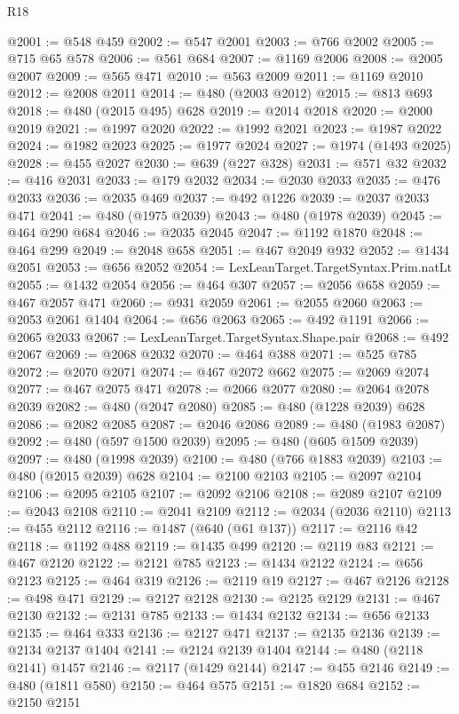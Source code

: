 \begin{lexlean}{R18}
\begin{coremodule}
@2001 := @548 @459
@2002 := @547 @2001
@2003 := @766 @2002
@2005 := @715 @65 @578
@2006 := @561 @684
@2007 := @1169 @2006
@2008 := @2005 @2007
@2009 := @565 @471
@2010 := @563 @2009
@2011 := @1169 @2010
@2012 := @2008 @2011
@2014 := @480 (@2003 @2012)
@2015 := @813 @693
@2018 := @480 (@2015 @495) @628
@2019 := @2014 @2018
@2020 := @2000 @2019
@2021 := @1997 @2020
@2022 := @1992 @2021
@2023 := @1987 @2022
@2024 := @1982 @2023
@2025 := @1977 @2024
@2027 := @1974 (@1493 @2025)
@2028 := @455 @2027
@2030 := @639 (@227 @328)
@2031 := @571 @32
@2032 := @416 @2031
@2033 := @179 @2032
@2034 := @2030 @2033
@2035 := @476 @2033
@2036 := @2035 @469
@2037 := @492 @1226
@2039 := @2037 @2033 @471
@2041 := @480 (@1975 @2039)
@2043 := @480 (@1978 @2039)
@2045 := @464 @290 @684
@2046 := @2035 @2045
@2047 := @1192 @1870
@2048 := @464 @299
@2049 := @2048 @658
@2051 := @467 @2049 @932
@2052 := @1434 @2051
@2053 := @656 @2052
@2054 := LexLeanTarget.TargetSyntax.Prim.natLt
@2055 := @1432 @2054
@2056 := @464 @307
@2057 := @2056 @658
@2059 := @467 @2057 @471
@2060 := @931 @2059
@2061 := @2055 @2060
@2063 := @2053 @2061 @1404
@2064 := @656 @2063
@2065 := @492 @1191
@2066 := @2065 @2033
@2067 := LexLeanTarget.TargetSyntax.Shape.pair
@2068 := @492 @2067
@2069 := @2068 @2032
@2070 := @464 @388
@2071 := @525 @785
@2072 := @2070 @2071
@2074 := @467 @2072 @662
@2075 := @2069 @2074
@2077 := @467 @2075 @471
@2078 := @2066 @2077
@2080 := @2064 @2078 @2039
@2082 := @480 (@2047 @2080)
@2085 := @480 (@1228 @2039) @628
@2086 := @2082 @2085
@2087 := @2046 @2086
@2089 := @480 (@1983 @2087)
@2092 := @480 (@597 @1500 @2039)
@2095 := @480 (@605 @1509 @2039)
@2097 := @480 (@1998 @2039)
@2100 := @480 (@766 @1883 @2039)
@2103 := @480 (@2015 @2039) @628
@2104 := @2100 @2103
@2105 := @2097 @2104
@2106 := @2095 @2105
@2107 := @2092 @2106
@2108 := @2089 @2107
@2109 := @2043 @2108
@2110 := @2041 @2109
@2112 := @2034 (@2036 @2110)
@2113 := @455 @2112
@2116 := @1487 (@640 (@61 @137))
@2117 := @2116 @42
@2118 := @1192 @488
@2119 := @1435 @499
@2120 := @2119 @83
@2121 := @467 @2120
@2122 := @2121 @785
@2123 := @1434 @2122
@2124 := @656 @2123
@2125 := @464 @319
@2126 := @2119 @19
@2127 := @467 @2126
@2128 := @498 @471
@2129 := @2127 @2128
@2130 := @2125 @2129
@2131 := @467 @2130
@2132 := @2131 @785
@2133 := @1434 @2132
@2134 := @656 @2133
@2135 := @464 @333
@2136 := @2127 @471
@2137 := @2135 @2136
@2139 := @2134 @2137 @1404
@2141 := @2124 @2139 @1404
@2144 := @480 (@2118 @2141) @1457
@2146 := @2117 (@1429 @2144)
@2147 := @455 @2146
@2149 := @480 (@1811 @580)
@2150 := @464 @575
@2151 := @1820 @684
@2152 := @2150 @2151

\end{coremodule}
\end{lexlean}
